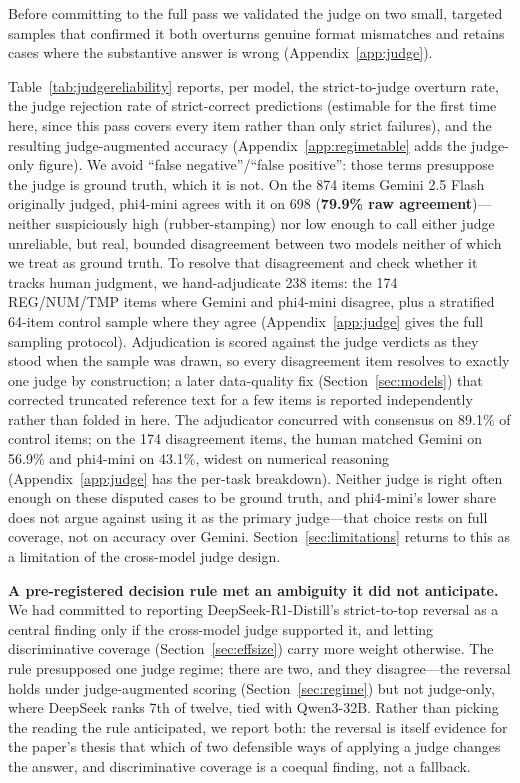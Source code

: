 Before committing to the full pass we validated the judge on two small, targeted samples that
confirmed it both overturns genuine format mismatches and retains cases where the substantive
answer is wrong (Appendix~\ref{app:judge}).

Table~\ref{tab:judgereliability} reports, per model, the strict-to-judge overturn rate, the judge
rejection rate of strict-correct predictions (estimable for the first time here, since this pass
covers every item rather than only strict failures), and the resulting judge-augmented accuracy
(Appendix~\ref{app:regimetable} adds the judge-only figure). We avoid ``false negative''/``false
positive'': those terms presuppose the judge is ground truth, which it is not. On the 874 items
Gemini 2.5 Flash originally judged, phi4-mini agrees with it on 698 (\textbf{79.9\% raw agreement})---
neither suspiciously high (rubber-stamping) nor low enough to call either judge unreliable, but real,
bounded disagreement between two models neither of which we treat as ground truth. To resolve that
disagreement and check whether it tracks human judgment, we hand-adjudicate 238 items: the 174
REG/NUM/TMP items where Gemini and phi4-mini disagree, plus a stratified 64-item control sample where
they agree (Appendix~\ref{app:judge} gives the full sampling protocol). Adjudication is scored
against the judge verdicts as they stood when the sample was drawn, so every disagreement item
resolves to exactly one judge by construction; a later data-quality fix (Section~\ref{sec:models})
that corrected truncated reference text for a few items is reported independently rather than folded
in here. The adjudicator concurred with consensus on 89.1\% of control items; on the 174 disagreement
items, the human matched Gemini on 56.9\% and phi4-mini on 43.1\%, widest on numerical reasoning
(Appendix~\ref{app:judge} has the per-task breakdown). Neither judge is right often enough on these
disputed cases to be ground truth, and phi4-mini's lower share does not argue against using it as the
primary judge---that choice rests on full coverage, not on accuracy over Gemini.
Section~\ref{sec:limitations} returns to this as a limitation of the cross-model judge design.

\textbf{A pre-registered decision rule met an ambiguity it did not anticipate.} We had committed to
reporting DeepSeek-R1-Distill's strict-to-top reversal as a central finding only if the cross-model
judge supported it, and letting discriminative coverage (Section~\ref{sec:effsize}) carry more
weight otherwise. The rule presupposed one judge regime; there are two, and they disagree---the
reversal holds under judge-augmented scoring (Section~\ref{sec:regime}) but not judge-only, where
DeepSeek ranks 7th of twelve, tied with Qwen3-32B. Rather than picking the reading the rule
anticipated, we report both: the reversal is itself evidence for the paper's thesis that which of
two defensible ways of applying a judge changes the answer, and discriminative coverage is a
coequal finding, not a fallback.

